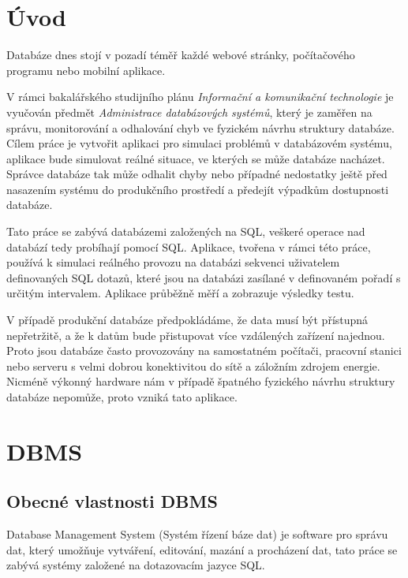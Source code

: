 \documentclass[czech,bachelor,public,dept460,male,cpdeclaration,twoside]{diploma}
\begin{document}
\MakeTitlePages


\section{Úvod}
Databáze dnes stojí v pozadí téměř každé webové stránky, počítačového programu nebo mobilní aplikace. \par
V rámci bakalářského studijního plánu \textit{Informační a komunikační technologie} je vyučován předmět \textit{Administrace databázových systémů}, který je zaměřen na správu, monitorování a odhalování chyb ve fyzickém návrhu struktury databáze.
Cílem práce je vytvořit aplikaci pro simulaci problémů v databázovém systému, aplikace bude simulovat reálné situace, ve kterých se může databáze nacházet. Správce databáze tak může odhalit chyby nebo případné nedostatky ještě před nasazením systému do produkčního prostředí a předejít výpadkům dostupnosti databáze. \par
Tato práce se zabývá databázemi založených na SQL, veškeré operace nad databází tedy probíhají pomocí SQL. Aplikace, tvořena v rámci této práce, používá k simulaci reálného provozu na databázi sekvenci uživatelem definovaných SQL dotazů, které jsou na databázi zasílané v definovaném pořadí s určitým intervalem. Aplikace průběžně měří a zobrazuje výsledky testu.\par
V případě produkční databáze předpokládáme, že data musí být přístupná nepřetržitě, a že k datům bude přistupovat více vzdálených zařízení najednou. Proto jsou databáze často provozovány na samostatném počítači, pracovní stanici nebo serveru s velmi dobrou konektivitou do sítě a záložním zdrojem energie. Nicméně výkonný hardware nám v případě špatného fyzického návrhu struktury databáze nepomůže, proto vzniká tato aplikace.

\section{DBMS} \label{dbms}
\subsection{Obecné vlastnosti DBMS}
Database Management System (Systém řízení báze dat) je software pro správu dat, který umožňuje vytváření, editování, mazání a procházení dat, tato práce se zabývá systémy založené na dotazovacím jazyce SQL.
\end{document}
